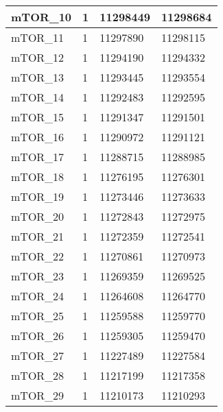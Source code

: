 \begin{longtable}{| p{} | C{.10\textwidth} | C{.35\textwidth} | C{.35\textwidth} |}
mTOR\_10                & 1            & 11298449              & 11298684            \\ \hline
mTOR\_11                & 1            & 11297890              & 11298115            \\ \hline
mTOR\_12                & 1            & 11294190              & 11294332            \\ \hline
mTOR\_13                & 1            & 11293445              & 11293554            \\ \hline
mTOR\_14                & 1            & 11292483              & 11292595            \\ \hline
mTOR\_15                & 1            & 11291347              & 11291501            \\ \hline
mTOR\_16                & 1            & 11290972              & 11291121            \\ \hline
mTOR\_17                & 1            & 11288715              & 11288985            \\ \hline
mTOR\_18                & 1            & 11276195              & 11276301            \\ \hline
mTOR\_19                & 1            & 11273446              & 11273633            \\ \hline
mTOR\_20                & 1            & 11272843              & 11272975            \\ \hline
mTOR\_21                & 1            & 11272359              & 11272541            \\ \hline
mTOR\_22                & 1            & 11270861              & 11270973            \\ \hline
mTOR\_23                & 1            & 11269359              & 11269525            \\ \hline
mTOR\_24                & 1            & 11264608              & 11264770            \\ \hline
mTOR\_25                & 1            & 11259588              & 11259770            \\ \hline
mTOR\_26                & 1            & 11259305              & 11259470            \\ \hline
mTOR\_27                & 1            & 11227489              & 11227584            \\ \hline
mTOR\_28                & 1            & 11217199              & 11217358            \\ \hline
mTOR\_29                & 1            & 11210173              & 11210293            \\ \hline

\end{longtable}
